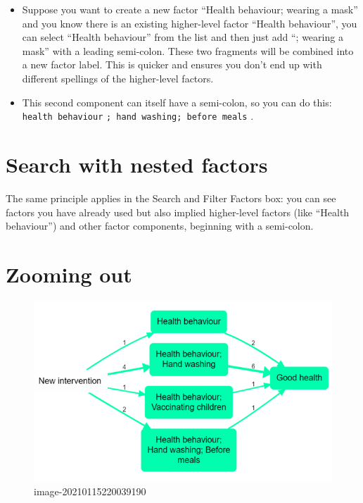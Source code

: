 \documentclass[
]{book}
\providecommand{\tightlist}{%
  \setlength{\itemsep}{0pt}\setlength{\parskip}{0pt}}
\begin{document}
\begin{itemize}
\tightlist
\item
  Suppose you want to create a new factor ``Health behaviour; wearing a mask'' and you know there is an existing higher-level factor ``Health behaviour'', you can select ``Health behaviour'' from the list and then just add ``; wearing a mask'' with a leading semi-colon. These two fragments will be combined into a new factor label. This is quicker and ensures you don't end up with different spellings of the higher-level factors.
\item
  This second component can itself have a semi-colon, so you can do this: \texttt{health\ behaviour} \texttt{;\ hand\ washing;\ before\ meals} .
\end{itemize}

\hypertarget{search-with-nested-factors}{%
\section{Search with nested factors}\label{search-with-nested-factors}}

The same principle applies in the Search and Filter Factors box: you can see factors you have already used but also implied higher-level factors (like ``Health behaviour'') and other factor components, beginning with a semi-colon.

\hypertarget{zooming-out}{%
\section{Zooming out}\label{zooming-out}}

\begin{figure}
\centering
\includegraphics[width=6.77083in,height=\textheight]{_assets/image-20210115220039190.png}
\caption{image-20210115220039190}
\end{figure}
\end{document}
